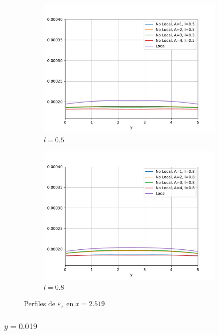 \begin{figure}
\begin{subfigure}{0.48\textwidth}
		    \centering
		        \includegraphics[width=\textwidth]{figuras/Placa/Perfiles/X/X0.5_2.519.pdf}
		        \caption{$l=0.5$}
		        \label{fig:perfilesX0259.05}
		    \end{subfigure}
		    \begin{subfigure}{0.48\textwidth}
		    \centering
		        \includegraphics[width=\textwidth]{figuras/Placa/Perfiles/X/X0.8_2.519.pdf}
		        \caption{$l=0.8$}
		        \label{fig:perfilesX0259.08}
		    \end{subfigure}
		    \caption{Perfiles de $\varepsilon_x$ en $x=2.519$}
		    \label{fig:perfilesX0259}
		\end{figure}

	\subsubsection{\texorpdfstring{$y=0.019$}{y=0.019}}



